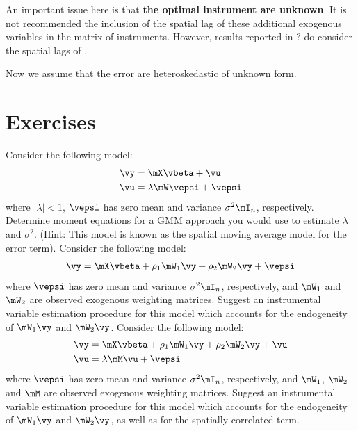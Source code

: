 \documentclass[english,12pt]{book}\usepackage[]{graphicx}\usepackage[]{xcolor}
\begin{document}
An important issue here is that \textbf{the optimal instrument are unknown}. It is not recommended the inclusion of the spatial lag of these additional exogenous variables in the matrix of instruments. However, results reported in ? do consider the spatial lags of . 

Now we assume that the error are heteroskedastic of unknown form. 


\section{Exercises}

\begin{exercises}
    \exercise Consider the following model:
  		\begin{equation*}
  			\begin{aligned}
  				\vy & = \mX\vbeta + \vu \\
  				\vu & = \lambda\mW\vepsi + \vepsi
  			\end{aligned}
  		\end{equation*}
  		where $\left|\lambda\right| < 1$, $\vepsi$ has zero mean and variance $\sigma^2\mI_n$, respectively. Determine moment equations for a GMM approach you would use to estimate $\lambda$ and $\sigma^2$. (Hint: This model is known as the spatial moving average model for the error term).
  		\exercise Consider the following model:
        \begin{equation*}
        \begin{aligned}
        \vy  = \mX\vbeta + \rho_1\mW_1\vy + \rho_2\mW_2\vy+ \vepsi
        \end{aligned}
        \end{equation*}
        where $\vepsi$ has zero mean and variance $\sigma^2\mI_n$, respectively, and $\mW_1$ and $\mW_2$ are observed exogenous weighting matrices. Suggest an instrumental variable estimation procedure for this model which accounts for the endogeneity of $\mW_1\vy$ and $\mW_2\vy$. 
        \exercise Consider the following model:
    \begin{equation*}
    	\begin{aligned}
    		\vy & = \mX\vbeta + \rho_1\mW_1\vy + \rho_2\mW_2\vy+ \vu \\
    		\vu & = \lambda\mM\vu + \vepsi
    	\end{aligned}
    \end{equation*}
    where $\vepsi$ has zero mean and variance $\sigma^2\mI_n$, respectively, and $\mW_1$, $\mW_2$ and $\mM$ are observed exogenous weighting matrices. Suggest an instrumental variable estimation procedure for this model which accounts for the endogeneity of $\mW_1\vy$ and $\mW_2\vy$, as well as for the spatially correlated term. 
\end{exercises}   
\end{document}
